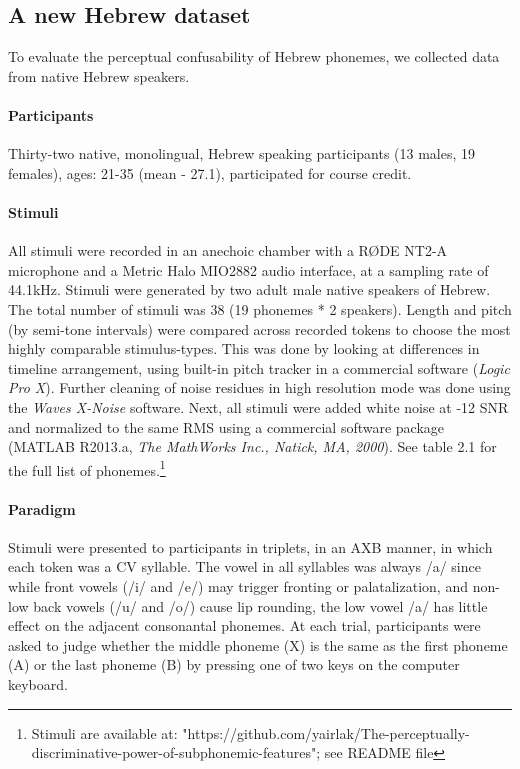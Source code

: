 \subsection{A new Hebrew dataset}
To evaluate the perceptual confusability of Hebrew phonemes, we collected data from native Hebrew speakers.

\paragraph{Participants}
Thirty-two native, monolingual, Hebrew speaking participants (13 males, 19 females), ages: 21-35 (mean - 27.1), participated for course credit.

\paragraph{Stimuli}
All stimuli were recorded in an anechoic chamber with a RØDE NT2-A microphone and a Metric Halo MIO2882 audio interface, at a sampling rate of 44.1kHz. Stimuli were generated by two adult male native speakers of Hebrew. The total number of stimuli was 38 (19 phonemes * 2 speakers). Length and pitch (by semi-tone intervals) were compared across recorded tokens to choose the most highly comparable stimulus-types. This was done by looking at differences in timeline arrangement, using built-in pitch tracker in a commercial software (\textit{Logic Pro X}). Further cleaning of noise residues in high resolution mode was done using the \textit{Waves X-Noise} software. Next, all stimuli were added white noise at -12 SNR and normalized to the same RMS using a commercial software package (MATLAB R2013.a, \textit{The MathWorks Inc., Natick, MA, 2000}). See table 2.1 for the full list of phonemes.\footnote{Stimuli are available at: "https://github.com/yairlak/The-perceptually-discriminative-power-of-subphonemic-features"; see README file}

\paragraph{Paradigm}
Stimuli were presented to participants in triplets, in an AXB manner, in which each token was a CV syllable. The vowel in all syllables was always /a/ since while front vowels (/i/ and /e/) may trigger fronting or palatalization, and non-low back vowels (/u/ and /o/) cause lip rounding, the low vowel /a/ has little effect on the adjacent consonantal phonemes. At each trial, participants were asked to judge whether the middle phoneme (X) is the same as the first phoneme (A) or the last phoneme (B) by pressing one of two keys on the computer keyboard.

